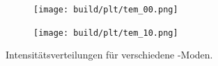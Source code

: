     \begin{figure}
    \centering
    \begin{subfigure}{.5\textwidth}
        \centering
        \texttt{[image: build/plt/tem\_00.png]}
        \caption{}
        \label{fig:theorie:tem_00}
    \end{subfigure}%
    \begin{subfigure}{.5\textwidth}
        \centering
        \texttt{[image: build/plt/tem\_10.png]}
        \caption{}
        \label{fig:theorie:tem_01}
    \end{subfigure}
    \caption{Intensitätsverteilungen für verschiedene \TEM{}-Moden.}
    \label{fig:theorie:tem}
    \end{figure}
